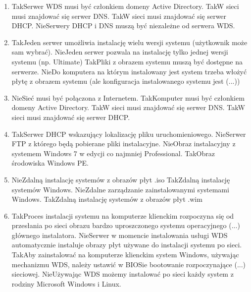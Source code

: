 \begin{enumerate}
		{Tak}{Kontroler domeny, serwer DNS, serwer DHCP}
		\item {}%
		{Tak}{Serwer WDS musi być członkiem domeny Active Directory.}%
		{Tak}{W sieci musi znajdować się serwer DNS.}%
		{Tak}{W sieci musi znajdować się serwer DHCP.}%
		{Nie}{Serwery DHCP i DNS muszą być niezależne od serwera WDS.}
		\item {}%
		{Tak}{Jeden serwer umożliwia instalację wielu wersji systemu (użytkownik może sam wybrać).}%
		{Nie}{Jeden serwer pozwala na instalację tylko jednej wersji systemu (np. Ultimate)}%
		{Tak}{Pliki z obrazem systemu muszą być dostępne na serwerze.}%
		{Nie}{Do komputera na którym instalowany jest system trzeba włożyć płytę z obrazem systemu (ale konfiguracja instalowanego systemu jest (...))}
		\item {}%
		{Nie}{Sieć musi być połączona z Internetem.}%
		{Tak}{Komputer musi być członkiem domeny Active Directory.}%
		{Tak}{W sieci musi znajdować się serwer DNS.}%
		{Tak}{W sieci musi znajdować się serwer DHCP.}
		\item {}%
		{Tak}{Serwer DHCP wskazujący lokalizację pliku uruchomieniowego.}%
		{Nie}{Serwer FTP z którego będą pobierane pliki instalacyjne.}%
		{Nie}{Obraz instalacyjny z systemem Windows 7 w edycji co najmniej Professional.}%
		{Tak}{Obraz środowiska Windows PE.}
		\item {}%
		{Nie}{Zdalną instalację systemów z obrazów płyt .iso}%
		{Tak}{Zdalną instalację systemów Windows.}%
		{Nie}{Zdalne zarządzanie zainstalowanymi systemami Windows.}%
		{Tak}{Zdalną instalację systemów z obrazów płyt .wim}
		\item {}%
		{Tak}{Proces instalacji systemu na komputerze klienckim rozpoczyna się od przesłania po sieci obrazu bardzo uproszczonego systemu operacyjnego (...) głównego instalatora.}%
		{Nie}{Serwer w momencie instalowania usługi WDS automatycznie instaluje obrazy płyt używane do instalacji systemu po sieci.}%
		{Tak}{Aby zainstalować na komputerze klienckim system Windows, używając mechanizmu WDS, należy ustawić w BIOSie bootowanie rozpoczynające (...) sieciowej.}%
		{Nie}{Używając WDS możemy instalować po sieci każdy system z rodziny Microsoft Windows i Linux.}
		
	\end{enumerate}